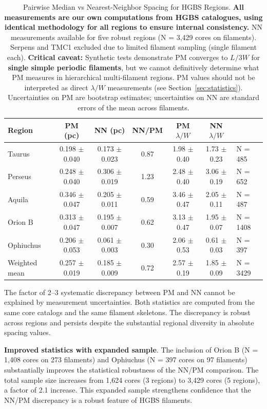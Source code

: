 \documentclass[twoside,twocolumn]{mnras}
\begin{document}
\begin{table}
\caption{Pairwise Median vs Nearest-Neighbor Spacing for HGBS Regions. \textbf{All measurements are our own computations from HGBS catalogues, using identical methodology for all regions to ensure internal consistency.} NN measurements available for five robust regions (N = 3,429 cores on filaments). Serpens and TMC1 excluded due to limited filament sampling (single filament each). \textbf{Critical caveat:} Synthetic tests demonstrate PM converges to $L/3W$ for \textbf{single simple periodic filaments}, but we cannot definitively determine what PM measures in hierarchical multi-filament regions. PM values should not be interpreted as direct $\lambda/W$ measurements (see Section~\ref{sec:statistics}). Uncertainties on PM are bootstrap estimates; uncertainties on NN are standard errors of the mean across filaments.}
\label{tab:nn_all}
\centering
\begin{tabular}{lccccc}
\toprule
Region & PM (pc) & NN (pc) & NN/PM & PM $\lambda/W$ & NN $\lambda/W$ \\
\midrule
Taurus    & 0.198 $\pm$ 0.040 & 0.173 $\pm$ 0.023 & 0.87 & 1.98 $\pm$ 0.40 & 1.73 $\pm$ 0.23 & N = 485 \\
Perseus   & 0.248 $\pm$ 0.040 & 0.306 $\pm$ 0.019 & 1.23 & 2.48 $\pm$ 0.40 & 3.06 $\pm$ 0.19 & N = 652 \\
Aquila    & 0.346 $\pm$ 0.047 & 0.205 $\pm$ 0.011 & 0.59 & 3.46 $\pm$ 0.47 & 2.05 $\pm$ 0.11 & N = 487 \\
Orion B   & 0.313 $\pm$ 0.047 & 0.195 $\pm$ 0.007 & 0.62 & 3.13 $\pm$ 0.47 & 1.95 $\pm$ 0.07 & N = 1408 \\
Ophiuchus & 0.206 $\pm$ 0.053 & 0.061 $\pm$ 0.003 & 0.30 & 2.06 $\pm$ 0.53 & 0.61 $\pm$ 0.03 & N = 397 \\
\midrule
Weighted mean & 0.257 $\pm$ 0.019 & 0.185 $\pm$ 0.009 & 0.72 & 2.57 $\pm$ 0.19 & 1.85 $\pm$ 0.09 & N = 3429 \\
\bottomrule
\end{tabular}
\end{table}

The factor of 2--3 systematic discrepancy between PM and NN cannot be explained by measurement uncertainties. Both statistics are computed from the same core catalogs and the same filament skeletons. The discrepancy is robust across regions and persists despite the substantial regional diversity in absolute spacing values.

\textbf{Improved statistics with expanded sample}. The inclusion of Orion B (N = 1,408 cores on 273 filaments) and Ophiuchus (N = 397 cores on 97 filaments) substantially improves the statistical robustness of the NN/PM comparison. The total sample size increases from 1,624 cores (3 regions) to 3,429 cores (5 regions), a factor of 2.1 increase. This expanded sample strengthens confidence that the NN/PM discrepancy is a robust feature of HGBS filaments.
\end{document}
